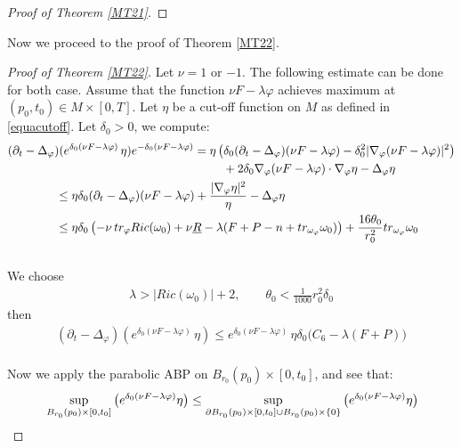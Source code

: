 \documentclass[11pt]{amsart}
\numberwithin{equation}{section}
\begin{document}
\begin{proof}[Proof of Theorem \ref{MT21}]
\end{proof}









\noindent
Now we proceed to the proof of Theorem \ref{MT22}. 

\begin{proof}[Proof of Theorem \ref{MT22}]
	Let $\nu=1$ or $-1$. The following estimate can be done for both case.  Assume that the function $\nu F-\lambda \varphi$ achieves maximum at $(p_0,t_0)\in M\times [0,T]$. Let $\eta$ be a cut-off function on $M$ as defined in \eqref{equacutoff}.	Let $\delta_0>0$, we compute:
	\begin{align}
		& (\partial_t-\Delta_\varphi)(e^{\delta_0 (\nu F-\lambda \varphi)}\,\eta) e^{-\delta_0 (\nu F-\lambda \varphi)} = \eta \left(\delta_0 (\partial_t-\Delta_\varphi) (\nu F-\lambda \varphi) - \delta_0^2 |\nabla_\varphi (\nu F -\lambda\varphi)|^2 \right) \notag\\
		& \qquad\qquad\qquad\qquad\qquad\qquad\qquad\qquad\qquad + 2\delta_0 \nabla_\varphi(\nu F-\lambda\varphi)\cdot \nabla_\varphi\eta - \Delta_\varphi\eta \notag\\ 
		& \qquad\qquad \le   \eta \delta_0 (\partial_t-\Delta_\varphi) (\nu F-\lambda \varphi) + \frac{|\nabla_\varphi\eta|^2}{\eta} - \Delta_\varphi\eta \notag\\
		& \qquad\qquad \le  \eta \delta_0 \left( - \nu\, tr_\varphi Ric(\omega_0) +\nu \underline R -\lambda(F+P-n+tr_{\omega_{\varphi}}\omega_0 )  \right) + \frac{16\theta_0}{r_0^2} tr_{\omega_{\varphi}}\omega_0 
	\end{align}\\
	We choose 
	\begin{align}
		\lambda>|Ric(\omega_0)|+2,\qquad \theta_0 < \frac{1}{1000} r_0^2\delta_0
	\end{align}
	 then 
	\begin{align}
		(\partial_t-\Delta_\varphi)(e^{\delta_0 (\nu F-\lambda \varphi)}\,\eta) \le  e^{\delta_0 (\nu F-\lambda \varphi)}\,\eta \delta_0 \big( C_6- \lambda(F+P)\big)
	\end{align}\\
	Now we apply the parabolic ABP on $B_{r_0}(p_0)\times [0,t_0]$, and see that: 
	\begin{align}
		& \sup_{B_{r_0}(p_0)\times [0,t_0]}\big(e^{\delta_0(\nu F-\lambda\varphi)}\eta\big)\le  \sup_{\partial B_{r_0}(p_0)\times [0,t_0] \cup B_{r_0}(p_0)\times \{0\}}\big( e^{\delta_0(\nu F-\lambda\varphi)}\eta \big) \notag\\

\end{align}
\end{proof}
\end{document}
